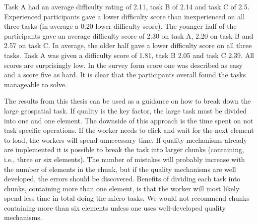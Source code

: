 Task A had an average difficulty rating of 2.11, task B of 2.14 and task C of 2.5. Experienced participants gave a lower difficulty score than inexperienced on all three tasks (in average a 0.20 lower difficulty score). The younger half of the participants gave an average difficulty score of 2.30 on task A, 2.20 on task B and 2.57 on task C. In average, the older half gave a lower difficulty score on all three tasks. Task A was given a difficulty score of 1.81, task B 2.05 and task C 2.39. All scores are surprisingly low. In the survey form score one was described as easy and a score five as hard. It is clear that the participants overall found the tasks manageable to solve. 

The results from this thesis can be used as a guidance on how to break down the large geospatial task. If quality is the key factor, the large task must be divided into one and one element. The downside of this approach is the time spent on not task specific operations. If the worker needs to click and wait for the next element to load, the workers will spend unnecessary time. If quality mechanisms already are implemented it is possible to break the task into larger chunks (containing, i.e., three or six elements). The number of mistakes will probably increase with the number of elements in the chunk, but if the quality mechanisms are well developed, the errors should be discovered. Benefits of dividing each task into chunks, containing more than one element, is that the worker will most likely spend less time in total doing the micro-tasks. We would not recommend chunks containing more than six elements unless one uses well-developed quality mechanisms. 





